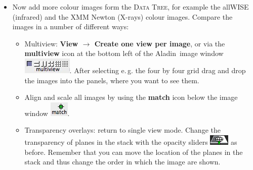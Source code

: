 \documentclass [a4paper, 12pt]{article}
\newcommand{\aladin}{{\textsc{A}{ladin}}}
\begin{document}
\begin{itemize}
    \item Now add more colour images form the \textsc{Data Tree}, for example 
the allWISE (infrared) and the XMM Newton (X-rays) colour images. Compare the 
images in a number of different ways:
    \begin{itemize}
        \item Multiview: \textbf{View $\rightarrow$ Create one view per image}, 
        or via the \textbf{multiview} icon at the bottom left of the \aladin\ 
        image window \includegraphics[width=0.1 
        \textwidth]{../images/aladin_button_multiview.jpg}. After selecting 
        e.\,g. the four by four grid drag and drop the images into the panels, 
        where you want to see them. 
        \item Align and scale all images by using the \textbf{match} icon below 
        the image window \includegraphics[width=0.04  
        \textwidth]{../images/aladin_button_match-views.jpg}. 
        \item Transparency overlays: return to single view mode. Change the 
        transparency of planes in the stack with the opacity sliders         
        \includegraphics[width=0.04  
        \textwidth]{../images/aladin_button_opacity.png} as before. Remember  
        that you can move the location of the planes in the stack and thus 
        change the order in which the image are shown.
    \end{itemize}
    

\end{itemize}
\end{document}

